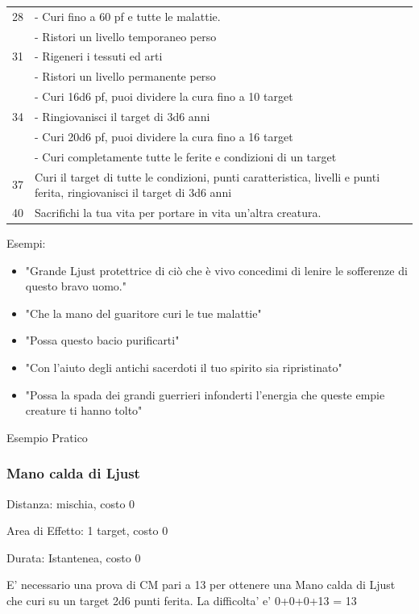 \documentclass[a4paper,11pt,twoside,openany]{book}
\begin{document}
\begin{longtable}{L{3cm} L{13cm}}
28 &- Curi fino a 60 pf e tutte le malattie.\\
& - Ristori un livello temporaneo perso\\
31 & - Rigeneri i tessuti ed arti\\
& - Ristori un livello permanente perso\\
& - Curi 16d6 pf, puoi dividere la cura fino a 10 target\\
34 & - Ringiovanisci il target di 3d6 anni\\
& - Curi 20d6 pf, puoi dividere la cura fino a 16 target\\
& - Curi completamente tutte le ferite e condizioni di un target\\
37 & Curi il target di tutte le condizioni, punti caratteristica, livelli e punti ferita, ringiovanisci il target di 3d6 anni\\
40 & Sacrifichi la tua vita per portare in vita un’altra creatura.\\
\end{longtable}

\bigskip


Esempi:
\begin{itemize}
\item 
"Grande Ljust protettrice di ciò che è vivo concedimi di lenire
le sofferenze di questo bravo uomo." 
\item 
"Che la mano del guaritore curi le tue malattie" 
\item 
"Possa questo bacio purificarti" 
\item 
"Con l'aiuto degli antichi sacerdoti il tuo spirito sia ripristinato" 
\item 
"Possa la spada dei grandi guerrieri infonderti l'energia che queste empie creature ti hanno tolto" 
\end{itemize}

\bigskip

Esempio Pratico

\subsubsection{Mano calda di Ljust}

Distanza: mischia, costo 0

Area di Effetto: 1 target, costo 0

Durata: Istantenea, costo 0

E’ necessario una prova di CM pari a 13 per ottenere una Mano calda di Ljust che curi su un target
2d6 punti ferita. La difficolta’ e’ 0+0+0+13 = 13
\end{document}
